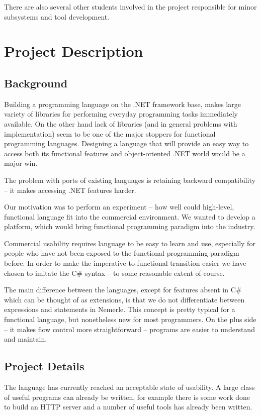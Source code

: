 \documentclass[a4paper,11pt]{article}
\begin{document}
There are also several other students involved in the project
responsible for minor subsystems and tool development.


\section{Project Description}

\subsection{Background}
Building a programming language on the .NET framework base, makes large
variety of libraries for performing everyday programming tasks immediately
available. On the other hand lack of libraries (and in general problems
with implementation) seem to be one of the major stoppers for functional
programming languages. Designing a language that will provide an easy way
to access both its functional features and object-oriented .NET world
would be a major win.

The problem with ports of existing languages is retaining backward
compatibility -- it makes accessing .NET features harder.

Our motivation was to perform an experiment -- how well could high-level,
functional language fit into the commercial environment. We wanted to
develop a platform, which would bring functional programming paradigm
into the industry.

Commercial usability requires language to be easy to learn and
use, especially for people who have not been exposed to the
functional programming paradigm before.  In order to make the
imperative-to-functional transition easier we have chosen to imitate
the C\# syntax -- to some reasonable extent of course.

The main difference between the languages, except for features absent
in C\# which can be thought of as extensions, is that we do not
differentiate between expressions and statements in Nemerle. This
concept is pretty typical for a functional language, but nonetheless
new for most programmers.  On the plus side -- it makes flow control
more straightforward -- programs are easier to understand and maintain.


\subsection{Project Details}

The language has currently reached an acceptable state of usability.
A large class of useful programs can already be written, for example
there is some work done to build an HTTP server and a number of
useful tools has already been written.
\end{document}
